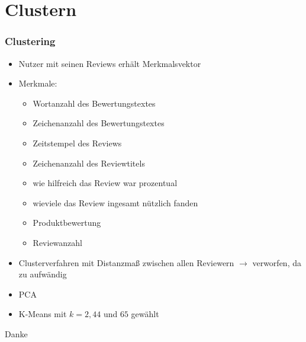 \documentclass{beamer}
\begin{document}
	\section{Clustern}
	\begin{frame}
	\frametitle{Clustering}
	\begin{itemize}
	\item Nutzer mit seinen Reviews erhält Merkmalsvektor
	\item Merkmale:
	\begin{itemize}
	\item Wortanzahl des Bewertungstextes
	\item Zeichenanzahl des Bewertungstextes
	\item Zeitstempel des Reviews
	\item Zeichenanzahl des Reviewtitels
	\item wie hilfreich das Review war prozentual
	\item wieviele das Review ingesamt nützlich fanden
	\item Produktbewertung
	\item Reviewanzahl
	\end{itemize}
	\item Clusterverfahren mit Distanzmaß zwischen allen Reviewern $\rightarrow$ verworfen, da zu aufwändig
	\item PCA
	\item K-Means mit $k=2,44$ und $65$ gewählt
	\end{itemize}
	\end{frame}
	
	\begin{frame}
	\centering
	{\Huge Danke}
	\end{frame}
	
	
\end{document}
